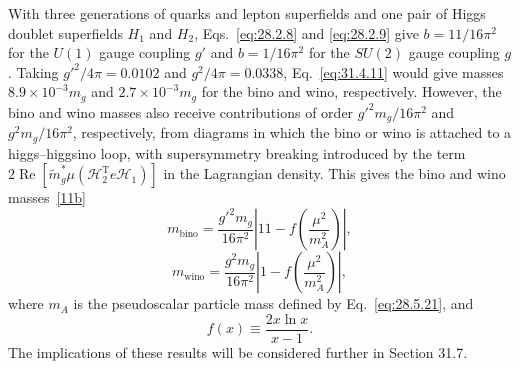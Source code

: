 With three generations of quarks and lepton superfields and one pair of
Higgs doublet superfields \(H_1\) and \(H_2\),
Eqs.~\eqref{eq:28.2.8} and \eqref{eq:28.2.9} give \(b=11/16\pi^2\) for
the \(U(1)\) gauge coupling \(g'\) and \(b=1/16\pi^2\) for the \(SU(2)\)
gauge coupling \(g\). Taking \(g'^2/4\pi=0.0102\) and
\(g^2/4\pi=0.0338\), Eq.~\eqref{eq:31.4.11} would give masses
\(8.9\times10^{-3}m_g\) and \(2.7\times10^{-3}m_g\) for the bino and
wino, respectively. However, the bino and wino masses also receive
contributions of order \(g'^2m_g/16\pi^2\) and \(g^2m_g/16\pi^2\),
respectively, from diagrams in which the bino or wino is attached to a
higgs--higgsino loop, with supersymmetry breaking introduced by the term
\(2\operatorname{Re}
[\widetilde m_g^*\mu(\mathcal H_2^{\mathrm T}e\mathcal H_1)]\)
in the Lagrangian density. This gives the bino and wino
masses~\hyperref[ch31-ref-11b]{[11b]}
\begin{equation}
  m_{\mathrm{bino}}
  =\frac{g'^2m_g}{16\pi^2}
   \left|11-f\left(\frac{\mu^2}{m_A^2}\right)\right|,
  \tag{31.4.15}\label{eq:31.4.15}
\end{equation}
\begin{equation}
  m_{\mathrm{wino}}
  =\frac{g^2m_g}{16\pi^2}
   \left|1-f\left(\frac{\mu^2}{m_A^2}\right)\right|,
  \tag{31.4.16}\label{eq:31.4.16}
\end{equation}
where \(m_A\) is the pseudoscalar particle mass defined by
Eq.~\eqref{eq:28.5.21}, and
\begin{equation}
  f(x)\equiv\frac{2x\ln x}{x-1}.
  \tag{31.4.17}\label{eq:31.4.17}
\end{equation}
The implications of these results will be considered further in Section
31.7.

